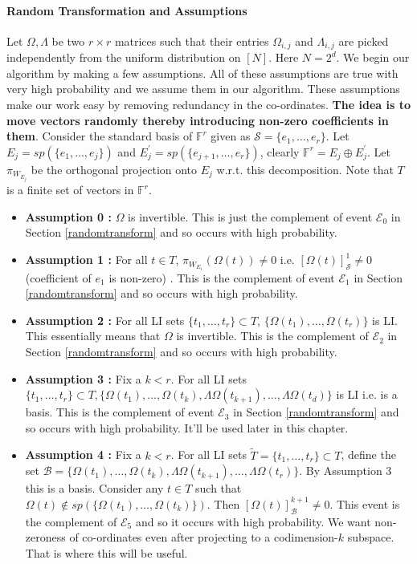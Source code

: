 \documentclass[letterpaper,USenglish,numberwithinsect]{lipics}
\newcommand{\F}{\mathbb{F}}
\newcommand{\MB}{\mathcal{B}}
\newcommand{\ME}{\mathcal{E}}
\newcommand{\MS}{\mathcal{S}}
\begin{document}
\paragraph{Random Transformation and Assumptions}\label{assumptions}
Let $\Omega,\Lambda$ be two $r\times r$ matrices such that their entries $\Omega_{i,j}$ and $\Lambda_{i,j}$ are picked
independently from the uniform distribution on $[N]$. Here $N = 2^d$.
We begin our algorithm by making a few assumptions. All of these assumptions are
true with very high probability and we assume them in our algorithm. These assumptions make our work easy
by removing redundancy in the co-ordinates. {\bf The idea is to move vectors randomly thereby introducing non-zero coefficients in them}. Consider the standard basis of $\F^r$ given
as $\MS = \{e_1,\ldots,e_r\}$. Let $E_j = sp(\{e_1,\ldots,e_j\})$
and $E_j^{\prime} = sp(\{e_{j+1},\ldots,e_r\})$, clearly $\F^r = E_j\oplus E_j^\prime$. Let $\pi_{W_{E_j}}$ be
the orthogonal projection onto $E_j$ w.r.t. this decomposition. Note that $T$ is a finite set of vectors in $\F^r$.
\begin{itemize}
\item {\bf Assumption 0 : } $\Omega$ is invertible. This is just the complement of event $\ME_0$ in Section
\ref{randomtransform} and so occurs with high probability.
 \item {\bf Assumption 1 : } For all $t\in T$,
 $\pi_{W_{E_1}}(\Omega(t))\neq 0$ i.e. $[\Omega(t)]^1_{\MS}\neq 0$ (coefficient of $e_1$ is non-zero) .  This is the complement of event $\ME_1$ in Section \ref{randomtransform}
 and so occurs with high probability.
 \item {\bf Assumption 2 : } For all LI sets $\{t_1,\ldots,t_r\}\subset T$, $\{\Omega(t_1),\ldots,\Omega(t_r)\}$ is LI.
 This essentially means that $\Omega$ is invertible. This is the complement of $\ME_2$ in Section \ref{randomtransform}
 and so occurs with high probability.
 \item {\bf Assumption 3 : } Fix a $k<r$. For all LI sets $\{t_1,\ldots,t_r\} \subset T, \{\Omega(t_1),\ldots,\Omega(t_k),\Lambda\Omega(t_{k+1}),
 \ldots , \Lambda\Omega(t_d) \}$ is LI i.e. is a basis. This is the complement of event $\ME_3$ in Section \ref{randomtransform} and so occurs with
 high probability. It'll be used later in this chapter.
 \item {\bf Assumption 4 : } Fix a $k<r$. For all LI sets $\tilde T = \{t_1,\ldots,t_r\}\subset T$,
 define the set $\MB = \{\Omega(t_1),\ldots,\Omega(t_k),\Lambda\Omega(t_{k+1}),\ldots,\Lambda\Omega(t_r)\}$. By Assumption $3$ this is a basis.
 Consider any $t\in T$ such that $\Omega(t) \notin sp(\{\Omega(t_1),\ldots,\Omega(t_k)\})$.
 Then $[\Omega(t)]^{k+1}_\MB\neq 0$. This event is the complement of $\ME_5$ and so it occurs with high probability. We want
 non-zeroness of co-ordinates even after projecting to a codimension-$k$ subspace. That is where this will be useful.

\end{itemize}
\end{document}
